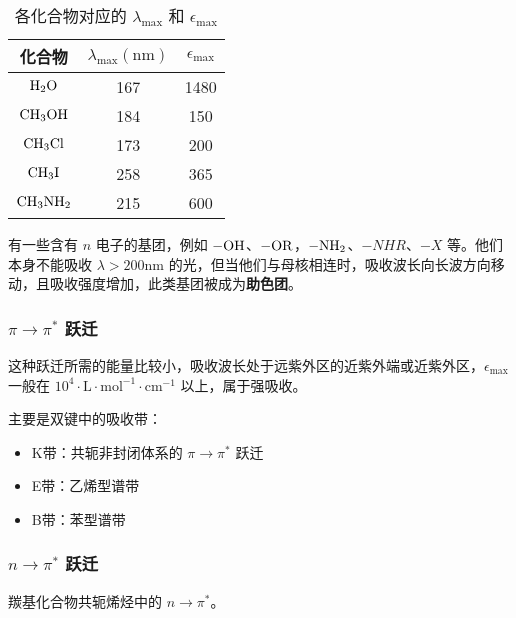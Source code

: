 \begin{table}[H]
    \centering
    \caption{各化合物对应的 $\lambda_{\max}$ 和 $\epsilon_{\max}$}
    \begin{tabular}{ccc}
        \toprule
        化合物           & $\lambda_{\max} (\mathrm{nm})$ & $ \epsilon_{\max}$ \\
        \midrule
        $\ce{H2O}$    & 167                            & 1480               \\
        $\ce{CH3OH}$  & 184                            & 150                \\
        $\ce{CH3Cl}$  & 173                            & 200                \\
        $\ce{CH3I}$   & 258                            & 365                \\
        $\ce{CH3NH2}$ & 215                            & 600                \\
        \bottomrule
    \end{tabular}
\end{table}

有一些含有 $n$ 电子的基团，例如 $\ce{-OH}$、$\ce{-OR}$，$\ce{-NH2}$、$-NHR$、$-X$ 等。他们本身不能吸收 $\lambda > 200 \mathrm{nm}$ 的光，但当他们与母核相连时，吸收波长向长波方向移动，且吸收强度增加，此类基团被成为\textbf{助色团}。

\subsubsection{$\pi \rightarrow \pi^*$ 跃迁}

这种跃迁所需的能量比较小，吸收波长处于远紫外区的近紫外端或近紫外区，$\epsilon_{\max}$ 一般在 $10^4 \cdot \mathrm{L} \cdot \mathrm{mol}^{-1} \cdot \mathrm{cm}^{-1}$ 以上，属于强吸收。

主要是双键中的吸收带：

\begin{itemize}
    \item K带：共轭非封闭体系的 $\pi \rightarrow \pi^*$ 跃迁
    \item E带：乙烯型谱带
    \item B带：苯型谱带
\end{itemize}

\subsubsection{$n \rightarrow \pi^*$ 跃迁}

羰基化合物共轭烯烃中的 $n \rightarrow \pi^*$。

